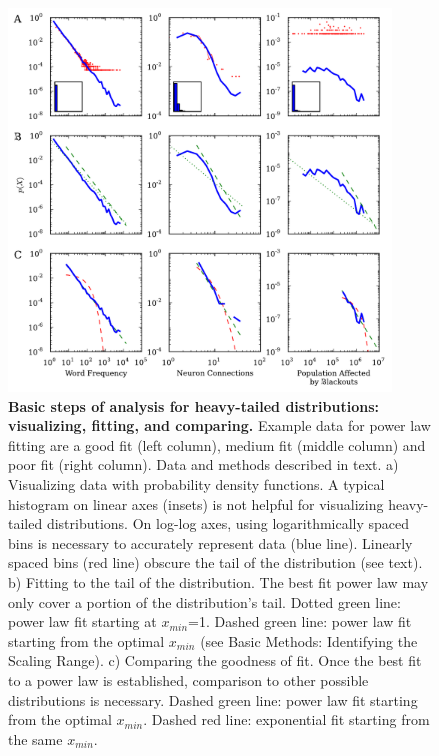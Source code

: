 \documentclass[10pt]{article}
\begin{document}
\begin{figure}[!ht]
\begin{center}
\includegraphics[width=4in]{FigWorkflow.pdf}
\end{center}
\caption{
{\bf Basic steps of analysis for heavy-tailed distributions: visualizing, fitting, and comparing.} Example data for power law fitting are a good fit (left column), medium fit (middle column) and poor fit (right column). Data and methods described in text.
a) Visualizing data with probability density functions. A typical histogram on linear axes (insets) is not helpful for visualizing heavy-tailed distributions. On log-log axes, using logarithmically spaced bins is necessary to accurately represent data (blue line). Linearly spaced bins (red line) obscure the tail of the distribution (see text).
b) Fitting to the tail of the distribution. The best fit power law may only cover a portion of the distribution's tail. Dotted green line: power law fit starting at $x_{min}$=1. Dashed green line: power law fit starting from the optimal $x_{min}$ (see Basic Methods: Identifying the Scaling Range). 
c) Comparing the goodness of fit. Once the best fit to a power law is established, comparison to other possible distributions is necessary.  Dashed green line: power law fit starting from the optimal $x_{min}$. Dashed red line: exponential fit starting from the same $x_{min}$.
}
\label{Workflow}
\end{figure}
\end{document}
